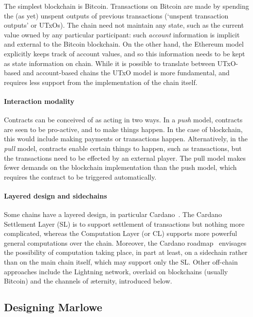 \documentclass[
      acmsmall
    , screen
  ]{acmart}
\begin{document}
The simplest blockchain is Bitcoin. Transactions on Bitcoin are made by spending the (as yet) unspent outputs of 
previous transactions (`unspent transaction outputs' or UTxOs). The chain need not maintain any state, such as the 
current value owned by any particular participant: such \emph{account} information is implicit and external to the 
Bitcoin blockchain. On the other hand, the Ethereum model explicitly keeps track of account values, and so this 
information needs to be kept as state information on chain. While it is possible to translate between UTxO-based and 
account-based chains  the UTxO model is more fundamental, and requires less support from the 
implementation of the chain itself.

\paragraph{Interaction modality}

Contracts can be conceived of as acting in two ways. In a \emph{push} model, contracts are seen to be pro-active, and to 
make things happen. In the case of blockchain, this would include making payments or transactions happen. 
Alternatively, in the \emph{pull} model, contracts enable certain things to happen, such as transactions, but the 
transactions need to be effected by an external player. The pull model makes fewer demands on the blockchain 
implementation than the push model, which requires the contract to be triggered automatically.

\paragraph{Layered design and sidechains}

Some chains have a layered design, in particular Cardano~\cite{cardano}. The Cardano Settlement Layer (SL) is to support settlement of transactions but nothing more complicated, whereas the Computation Layer (or CL) supports more powerful general computations over the chain. Moreover, the Cardano roadmap~\cite{cardano-rationale} envisages the possibility of computation taking place, in part at least, on a sidechain rather than on the main chain itself, which may support only the SL. Other off-chain approaches include the Lightning network, overlaid on blockchains (usually Bitcoin) and the channels of \ae{}ternity, introduced below.

\subsection{Designing Marlowe}
\end{document}
